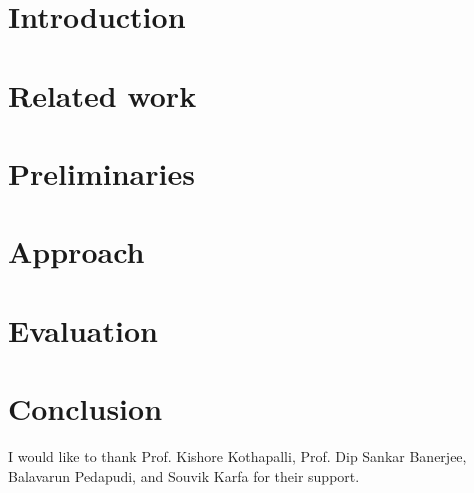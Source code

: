 \documentclass[sigconf,nonacm]{acmart}
\begin{document}





\maketitle

\section{Introduction}
\label{sec:introduction}


\section{Related work}
\label{sec:related}


\section{Preliminaries}
\label{sec:preliminaries}


\section{Approach}
\label{sec:approach}


\section{Evaluation}
\label{sec:evaluation}


\section{Conclusion}
\label{sec:conclusion}


\begin{acks}
I would like to thank Prof. Kishore Kothapalli, Prof. Dip Sankar Banerjee, Balavarun Pedapudi, and Souvik Karfa for their support.
\end{acks}



\end{document}
